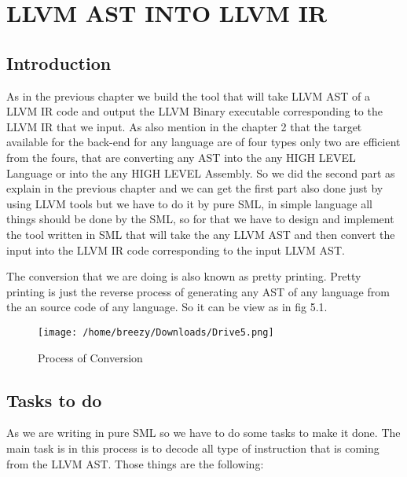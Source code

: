 \documentclass[openany]{book}
\begin{document}
\chapter{LLVM AST INTO LLVM IR}
\section{Introduction}
As in the previous chapter we build the tool that will take LLVM AST of a LLVM IR code and output the LLVM Binary executable corresponding to the LLVM IR that we input. As also mention in the chapter 2 that the target available for the back-end for any language are of four types only two are efficient from the fours, that are converting any AST into the any HIGH LEVEL Language or into the any HIGH LEVEL Assembly. So we did the second part as explain in the previous chapter and we can get the first part also done just by using LLVM tools but we have to do it by pure SML, in simple language all things should be done by the SML, so for that we have to design and implement the tool written in SML that will take the any LLVM AST and then convert the input into the LLVM IR code corresponding to the input LLVM AST. \newline

The conversion that we are doing is also known as pretty printing. Pretty printing is just the reverse process of generating any AST of any language from the an source code of any language.  So it can be view as in fig 5.1.\newpage

\begin{figure}[h]
	\texttt{[image: /home/breezy/Downloads/Drive5.png]}
	\caption{Process of Conversion}
	\label{fig:5.1}
\end{figure} 

\section{Tasks to do}
As we are writing in pure SML so we have to do some tasks to make it done. The main task is in this process is to decode all type of instruction that is coming from the LLVM AST. Those things are the following:
\end{document}
